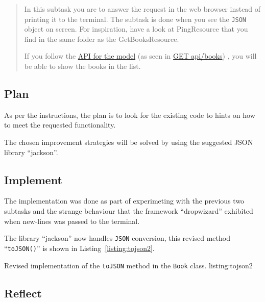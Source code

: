 \begin{quote}
  In this subtask you are to answer the request in the web browser instead of
  printing it to the terminal. The subtask is done when you see the \texttt{JSON} object
  on screen. For inspiration, have a look at PingResource that you find in the
  same folder as the GetBooksResource. 

  If you follow the 
  \href{https://htmlpreview.github.io/?https://github.com/tobias-dv-lnu/1dv600-lab/blob/master/api-specification/api-specification.html}{API for the model}
  (as seen in 
  \href{https://htmlpreview.github.io/?https://github.com/tobias-dv-lnu/1dv600-lab/blob/master/api-specification/api-specification.html\#books-get}{GET api/books})
  , you will be able to show the books in the list.
\end{quote}


\subsection{Plan}\label{task-1c-plan}
As per the instructions, the plan is to look for the existing code to hints
on how to meet the requested functionality.

The chosen improvement strategies will be solved by using the suggested JSON
library ``jackson''\cite{ackson-json}.

\subsection{Implement}\label{task-1c-implement}
The implementation was done as part of experimeting with the previous two
subtasks and the strange behaviour that the framework ``dropwizard'' exhibited
when new-lines was passed to the terminal.

The library ``jackson'' now handles \texttt{JSON} conversion,  this revised
method ``\texttt{toJSON()}'' is shown in Listing~\ref{listing:tojson2}.

           {Revised implementation of the \texttt{toJSON\(\)} method in the
            \texttt{Book} class.}
           {listing:tojson2}


\subsection{Reflect}\label{task-1c-reflect}
